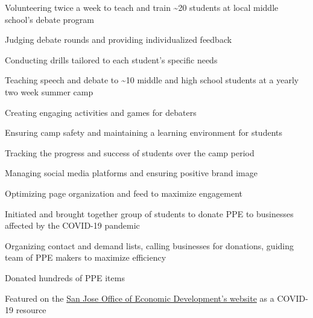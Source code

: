 \documentclass[letterpaper]{resume-shreeram}
\begin{document}
\begin{compactitem}
    \item Volunteering twice a week to teach and train
      \textasciitilde{}20 students at local middle school's debate
      program

    \item Judging debate rounds and providing individualized feedback

    \item Conducting drills tailored to each student's specific needs
\end{compactitem}

\begin{compactitem}
    \item Teaching speech and debate to \textasciitilde{}10 middle and
      high school students at a yearly two week summer camp

    \item Creating engaging activities and games for debaters

    \item Ensuring camp safety and maintaining a learning environment
      for students

    \item Tracking the progress and success of students over the camp
      period
\end{compactitem}

\begin{compactitem}
    \item Managing social media platforms and ensuring positive brand
      image

    \item Optimizing page organization and feed to maximize engagement
\end{compactitem}

\begin{compactitem}
    \item Initiated and brought together group of students to donate PPE
      to businesses affected by the COVID-19 pandemic

    \item Organizing contact and demand lists, calling businesses for
      donations, guiding team of PPE makers to maximize efficiency

    \item Donated hundreds of PPE items

    \item Featured on the
      \href{https://www.sjeconomy.com/why-san-jose/covid-19-guidance/local-suppliers}{San
      Jose Office of Economic Development's website} as a COVID-19
      resource
\end{compactitem}
\end{document}
